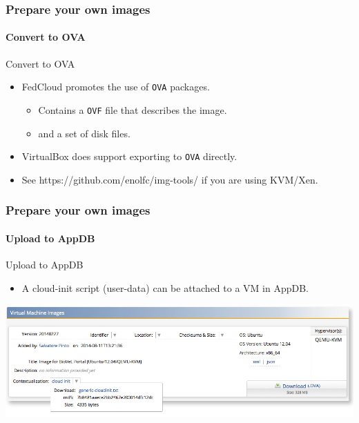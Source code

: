 
\begin{frame}
  \frametitle{Prepare your own images}
  \framesubtitle{Convert to OVA}
    
  \begin{block}{Convert to OVA}
    \begin{itemize}
        \item FedCloud promotes the use of \texttt{OVA} packages.
        \begin{itemize}
        \item Contains a \texttt{OVF} file that describes the image.
        \item and a set of disk files.
        \end{itemize}
        \item VirtualBox does support exporting to \texttt{OVA} directly.
        \item See https://github.com/enolfc/img-tools/ if you are using KVM/Xen.
    \end{itemize}
  \end{block}
\end{frame}


\begin{frame}
  \frametitle{Prepare your own images}
  \framesubtitle{Upload to AppDB}

  \begin{block}{Upload to AppDB}
    \begin{itemize}
        \item A cloud-init script (user-data) can be attached to a VM
            in AppDB.
    \end{itemize}
    \includegraphics[width=\textwidth]{images/appdb_context}

  \end{block}
\end{frame}

